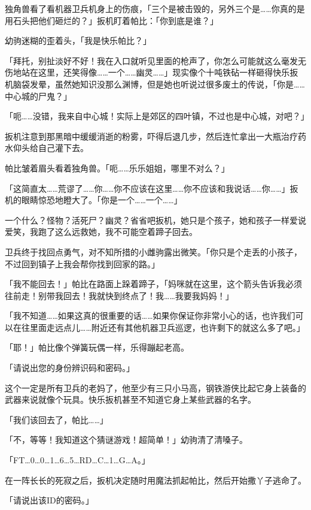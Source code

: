 独角兽看了看机器卫兵机身上的伤痕，「三个是被击毁的，另外三个是……你真的是用石头把他们砸烂的？」扳机盯着帕比：「你到底是谁？」

幼驹迷糊的歪着头，「我是快乐帕比？」

「拜托，别扯淡好不好！我在入口就听见里面的枪声了，你怎么可能就这么毫发无伤地站在这里，还笑得像……一个……幽灵……」现实像个十吨铁砧一样砸得快乐扳机脑袋发晕，虽然她知识没那么渊博，但是她也听说过很多废土的传说，「你是……中心城的尸鬼？」

「呃……没错，我来自中心城！实际上是郊区的四叶镇，不过也是中心城，对吧？」

扳机注意到那黑暗中缓缓消逝的粉雾，吓得后退几步，然后连忙拿出一大瓶治疗药水仰头给自己灌下去。

帕比皱着眉头看着独角兽。「呃……乐乐姐姐，哪里不对么？」

「这简直太……荒谬了……你……你不应该在这里……你不应该和我说话……你……」扳机的眼睛惊恐地瞪大了。「你是一个……一个……」

一个什么？怪物？活死尸？幽灵？省省吧扳机，她只是个孩子，她和孩子一样爱说爱笑，我跑了这么远救她，我不可能空着蹄子回去。

卫兵终于找回点勇气，对不知所措的小雌驹露出微笑。「你只是个走丢的小孩子，不过回到镇子上我会帮你找到回家的路。」

「我不能回去！」帕比在路面上跺着蹄子，「妈咪就在这里，这个箭头告诉我必须往前走！别带我回去！我就快到终点了！我……我要我妈妈！」

「我不知道……如果这真的很重要的话……如果你保证你非常小心的话，也许我们可以在往里面走远点儿……附近还有其他机器卫兵巡逻，也许剩下的就这么多了吧。」

「耶！」帕比像个弹簧玩偶一样，乐得蹦起老高。

\horizonline


「{\mt 请说出您的身份辨识码和密码。}」

这个一定是所有卫兵的老妈了，他至少有三只小马高，钢铁游侠比起它身上装备的武器来说就像个玩具。快乐扳机甚至不知道它身上某些武器的名字。

「我们该回去了，帕比……」

「不，等等！我知道这个猜谜游戏！超简单！」幼驹清了清嗓子。

「FT\dots 0\dots 0\dots 1\dots 6\dots 5\dots RD\dots C\dots 1\dots G\dots A。」

在一阵长长的死寂之后，扳机决定随时用魔法抓起帕比，然后开始撒丫子逃命了。

「{\mt 请说出该ID的密码。}」

